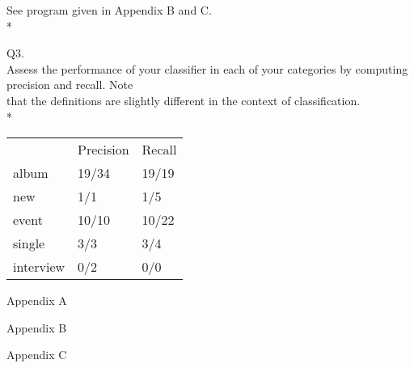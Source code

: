 \documentclass{article}
\begin{document}
See program given in Appendix B and C.\\*

Q3.\\
Assess the performance of your classifier in each of your categories by computing precision and recall.  Note\\
that the definitions are slightly different in the context of classification.\\*

\begin{tabular}{ l l l }
	&Precision	&Recall\\
album	&19/34		&19/19\\
new	&1/1		&1/5\\
event	&10/10		&10/22\\
single	&3/3		&3/4\\
interview&0/2		&0/0\\
\end{tabular}

\appendix
\newpage
Appendix A


\newpage
Appendix B


Appendix C

\end{document}

